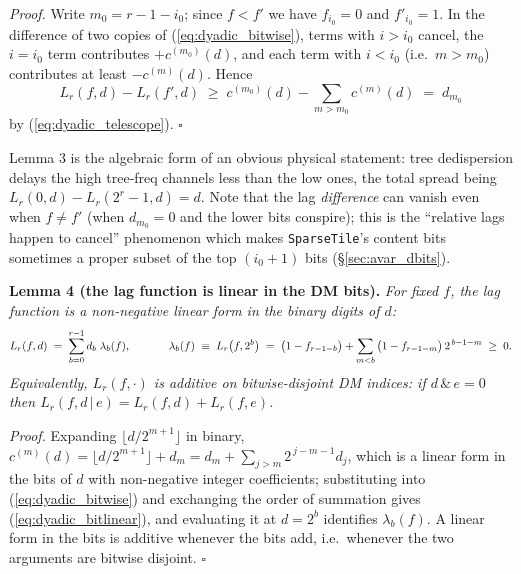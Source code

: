 \documentclass{article}
\numberwithin{equation}{section}   %
\begin{document}
\medskip
\par\noindent
{\em Proof.} Write $m_0 = r-1-i_0$; since $f<f'$ we have $f_{i_0}=0$ and $f'_{i_0}=1$. In
the difference of two copies of (\ref{eq:dyadic_bitwise}), terms with $i>i_0$ cancel, the
$i=i_0$ term contributes $+c^{(m_0)}(d)$, and each term with $i<i_0$ (i.e.\ $m>m_0$)
contributes at least $-c^{(m)}(d)$. Hence
\begin{equation}
L_r(f,d) - L_r(f',d) \;\ge\; c^{(m_0)}(d) - \sum_{m>m_0} c^{(m)}(d) \;=\; d_{m_0}
\end{equation}
by (\ref{eq:dyadic_telescope}). $\square$

\medskip
\par\noindent
Lemma 3 is the algebraic form of an obvious physical statement: tree dedispersion delays the
high tree-freq channels less than the low ones, the total spread being
$L_r(0,d) - L_r(2^r-1,d) = d$. Note that the lag {\em difference} can vanish even when
$f \ne f'$ (when $d_{m_0}=0$ and the lower bits conspire); this is the ``relative lags happen
to cancel'' phenomenon which makes {\tt SparseTile}'s content bits sometimes a proper subset
of the top $(i_0+1)$ bits (\S\ref{sec:avar_dbits}).

\medskip
\par\noindent
{\bf Lemma 4 (the lag function is linear in the DM bits).}
{\em For fixed $f$, the lag function is a non-negative linear form in the binary digits of
$d$:}
\begin{equation}
L_r(f,d) \;=\; \sum_{b=0}^{r-1} d_b \; \lambda_b(f),
  \hspace{1.2cm}
\lambda_b(f) \;\equiv\; L_r\big(f, 2^b\big)
  \;=\; \big(1 - f_{r-1-b}\big) + \sum_{m<b} \big(1-f_{r-1-m}\big) \, 2^{\,b-1-m} \;\ge\; 0.
\label{eq:dyadic_bitlinear}
\end{equation}
{\em Equivalently, $L_r(f,\cdot)$ is additive on bitwise-disjoint DM indices: if
$d \,\&\, e = 0$ then $L_r(f, d\,|\,e) = L_r(f,d) + L_r(f,e)$.}

\medskip
\par\noindent
{\em Proof.} Expanding $\lfloor d/2^{m+1}\rfloor$ in binary,
$c^{(m)}(d) = \lfloor d/2^{m+1}\rfloor + d_m = d_m + \sum_{j>m} 2^{\,j-m-1} d_j$,
which is a linear form in the bits of $d$ with
non-negative integer coefficients; substituting into (\ref{eq:dyadic_bitwise}) and exchanging
the order of summation gives (\ref{eq:dyadic_bitlinear}), and evaluating it at $d = 2^b$
identifies $\lambda_b(f)$. A linear form in the bits is additive whenever the bits add, i.e.\
whenever the two arguments are bitwise disjoint. $\square$
\end{document}
